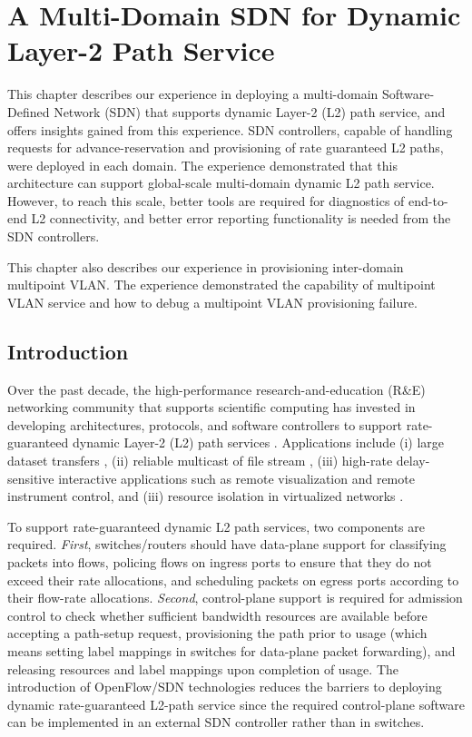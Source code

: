 \chapter{A Multi-Domain SDN for Dynamic Layer-2 Path Service}
\label{sec:cps}

This chapter describes our experience in deploying a multi-domain
Software-Defined Network (SDN) that supports dynamic
Layer-2 (L2) path service, and offers insights gained
from this experience. SDN controllers, capable of handling
requests for advance-reservation and provisioning of rate guaranteed
L2 paths, were deployed in each domain. The
experience demonstrated that this architecture can support
global-scale multi-domain dynamic L2 path service. However,
to reach this scale, better tools are required for diagnostics
of end-to-end L2 connectivity, and better error reporting
functionality is needed from the SDN controllers.

This chapter also describes our experience in provisioning inter-domain multipoint VLAN. The experience demonstrated the capability of multipoint VLAN service and how to debug a multipoint VLAN provisioning failure.

\section{Introduction}
Over the past decade, the high-performance research-and-education (R\&E) networking
community that supports scientific computing has invested in developing architectures,
protocols, and
software controllers to support rate-guaranteed
dynamic Layer-2 (L2) path services \cite{1541694,4444698,4374315,1497551,4146687,OSCARS,OESS,1742-6596-396-4-042065}.
Applications include
(i) large dataset transfers \cite{UVA-CTRQ2013},
(ii) reliable multicast of file stream \cite{ji2015file},
(iii) high-rate delay-sensitive interactive
applications such as remote visualization and remote
instrument control, and (iii) resource isolation in virtualized networks \cite{GENI}.

To support rate-guaranteed dynamic L2 path services,
two components are required. \emph{First},
switches/routers should have data-plane support for classifying packets into flows, policing flows on ingress ports to ensure that they do not exceed their rate allocations, and scheduling packets on egress ports according to their flow-rate allocations. \emph{Second}, control-plane support
is required for admission control to check whether sufficient bandwidth resources are available before accepting a path-setup request, provisioning the path prior to usage (which means setting label mappings in switches for data-plane packet forwarding), and releasing resources and label mappings upon completion of usage. The introduction of OpenFlow/SDN technologies reduces the barriers to deploying dynamic rate-guaranteed L2-path service since the required control-plane software can be implemented in an external SDN controller rather than in switches.

